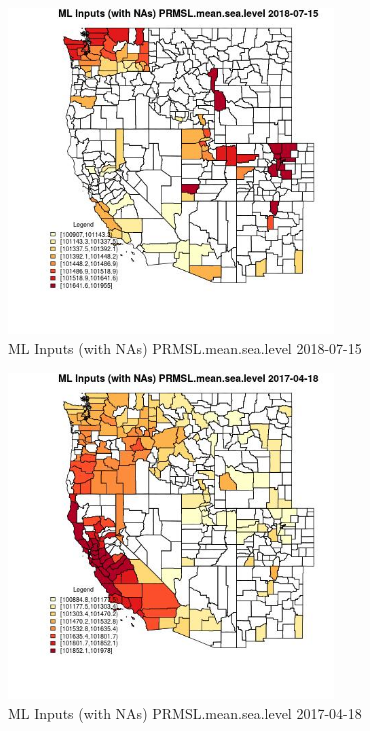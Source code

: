 \begin{figure} 
\centering  
\includegraphics[width=0.77\textwidth]{Code_Outputs/Report_ML_input_PM25_Step4_part_e_de_duplicated_aves_compiled_2019-05-21wNAs_CountyPRMSLmeansealevelMean2018-07-15.jpg} 
\caption{\label{fig:Report_ML_input_PM25_Step4_part_e_de_duplicated_aves_compiled_2019-05-21wNAsCountyPRMSLmeansealevelMean2018-07-15}ML Inputs (with NAs) PRMSL.mean.sea.level 2018-07-15} 
\end{figure} 
 

\begin{figure} 
\centering  
\includegraphics[width=0.77\textwidth]{Code_Outputs/Report_ML_input_PM25_Step4_part_e_de_duplicated_aves_compiled_2019-05-21wNAs_CountyPRMSLmeansealevelMean2017-04-18.jpg} 
\caption{\label{fig:Report_ML_input_PM25_Step4_part_e_de_duplicated_aves_compiled_2019-05-21wNAsCountyPRMSLmeansealevelMean2017-04-18}ML Inputs (with NAs) PRMSL.mean.sea.level 2017-04-18} 
\end{figure} 
 


